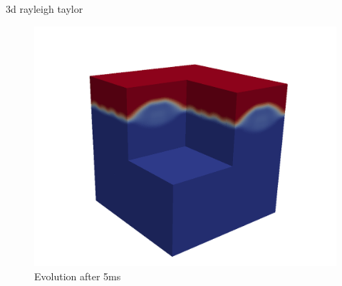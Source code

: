\begin{frame}{3d rayleigh taylor}
\begin{minipage}{0.49\textwidth}
\begin{block}{}
        	  				\begin{figure}
        	  						\centering
        	  						\includegraphics[width=1.2\textwidth]{../../figs/rt3/fd3d5w}
        	  						\caption{Evolution after 5ms}
        	  					\end{figure}
        	  		  	\end{block}
        	  	\end{minipage}
\end{frame}








	